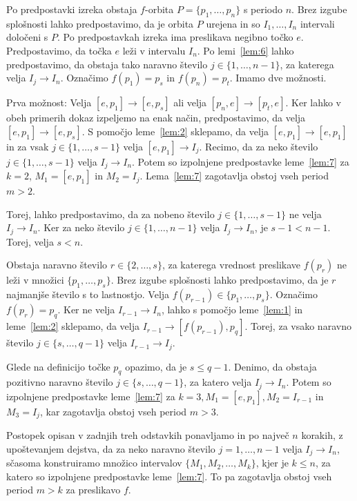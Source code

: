 \documentclass[../TG_magistrsko_delo_sections.tex]{subfiles}
\begin{document}
\begin{dokaz}
Po predpostavki izreka obstaja $f$-orbita $P = \{p_1, \dots, p_n\}$ s periodo $n$. Brez izgube splošnosti lahko predpostavimo, da je orbita $P$ urejena in so $I_1, \dots, I_n$ intervali določeni s $P$. Po predpostavkah izreka ima preslikava negibno točko $e$. Predpostavimo, da točka $e$ leži v intervalu $I_n$. Po lemi~\ref{lem:6} lahko predpostavimo, da obstaja tako naravno število $j \in \{1, \dots, n-1\}$, za katerega velja $I_j \to I_n$.
Označimo $f(p_1) = p_s$ in $f(p_n) = p_t$. Imamo dve možnosti.

Prva možnost: 
Velja $[e, p_1] \to [e, p_s]$ ali velja $[p_n, e] \to [p_t, e]$. Ker lahko v obeh primerih dokaz izpeljemo na enak način, predpostavimo, da velja $[e, p_1] \to [e, p_s]$. S pomočjo leme~\ref{lem:2} sklepamo, da velja $[e, p_1] \to [e, p_1]$ in za vsak $j \in \{1, \dots, s-1\}$ velja $[e, p_1] \to I_j$.
Recimo, da za neko število $j \in \{1, \dots, s-1\}$ velja $I_j \to I_n$. Potem so izpolnjene predpostavke leme~\ref{lem:7} za $k=2$, $M_1=[e, p_1]$ in $M_2 = I_j$. Lema~\ref{lem:7} zagotavlja obstoj vseh period $m > 2$.

Torej, lahko predpostavimo, da za nobeno število $j \in \{1, \dots, s-1\}$ ne velja $I_j \to I_n$. Ker za neko število $j \in \{1, \dots, n-1\}$ velja $I_j \to I_n$, je $s-1 < n-1$. Torej, velja $s < n$. 

Obstaja naravno število $r \in \{2, \dots, s\}$, za katerega vrednost preslikave $f(p_r)$ ne leži v množici $\{p_1, \dots, p_s \}$. %
Brez izgube splošnosti lahko predpostavimo, da je $r$ najmanjše število s to lastnostjo. Velja $f(p_{r-1}) \in \{p_1, \dots, p_s\}$. Označimo $f(p_r) = p_q$. Ker ne velja $I_{r-1} \to I_n$, lahko s pomočjo leme~\ref{lem:1} in leme~\ref{lem:2} sklepamo, da velja $I_{r-1} \to [f(p_{r-1}), p_q]$. Torej, za vsako naravno število $j \in \{s, \dots, q-1\}$ velja $I_{r-1} \to I_j$. 

Glede na definicijo točke $p_q$ opazimo, da je $s \leq q-1$. Denimo, da obstaja pozitivno naravno število $j \in \{s, \dots, q-1\}$, za katero velja $I_j \to I_n$. Potem so izpolnjene predpostavke leme~\ref{lem:7} za $k=3, M_1 = [e, p_1], M_2 = I_{r-1}$ in  $M_3 =I_j$, kar zagotavlja obstoj vseh period $m > 3$.

Postopek opisan v zadnjih treh odstavkih ponavljamo in po največ $n$ korakih, z upoštevanjem dejstva, da za neko naravno število $j = 1, \dots, n-1$ velja $I_j \to I_n$, sčasoma konstruiramo množico intervalov $\{M_1, M_2, \dots, M_k\}$, kjer je $k \leq n$, za katero so izpolnjene predpostavke leme~\ref{lem:7}. To pa zagotavlja obstoj vseh period $m > k$ za preslikavo $f$.


\end{dokaz}
\end{document}

